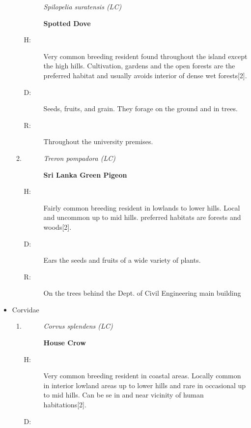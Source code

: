 \begin{itemize}
\begin{enumerate}
\begin{description}%
\item[]%
\textit{Spilopelia suratensis (LC)}%
\item[]%
\textbf{Spotted Dove}%
\end{description}%
\begin{description}%
\item[H: ]%
Very common breeding resident found throughout the island except the high hills. Cultivation, gardens and the open forests are the preferred habitat and usually avoids interior of dense wet forests{[}2{]}.%
\item[D: ]%
Seeds, fruits, and grain. They forage on the ground and in trees.%
\item[R: ]%
Throughout the university premises.%
\end{description}%
\item%
\begin{description}%
\item[]%
\textit{Treron pompadora (LC)}%
\item[]%
\textbf{Sri Lanka Green Pigeon}%
\end{description}%
\begin{description}%
\item[H: ]%
Fairly common breeding resident in lowlands to lower hills. Local and uncommon up to mid hills. preferred habitats are forests and woods{[}2{]}.%
\item[D: ]%
 Ears the seeds and fruits of a wide variety of plants.%
\item[R: ]%
On the trees behind the Dept. of Civil Engineering main building%
\end{description}%
\end{enumerate}%
\item%
Corvidae%
\begin{enumerate}%
\item%
\begin{description}%
\item[]%
\textit{Corvus splendens (LC)}%
\item[]%
\textbf{House Crow}%
\end{description}%
\begin{description}%
\item[H: ]%
Very common breeding resident in coastal areas. Locally common in interior lowland areas up to lower hills and rare in occasional up to mid hills. Can be se in and near vicinity of human habitations{[}2{]}.%
\item[D: ]%

\end{description}
\end{enumerate}
\end{itemize}
